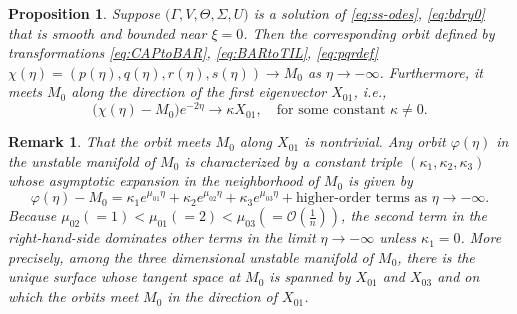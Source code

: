 \documentclass[a4paper,11pt]{article}
\def\BO{{\mathcal{O}}}
\newtheorem{proposition}{Proposition}[section]
\newtheorem{remark}{Remark}[section]
\begin{document}
\begin{proposition} \label{prop1}
    Suppose $\big(\Gamma,V,\Theta,\Sigma,U\big)$ is a solution of \eqref{eq:ss-odes}, \eqref{eq:bdry0} that is smooth and bounded near $\xi=0$. Then the corresponding orbit defined by transformations \eqref{eq:CAPtoBAR}, \eqref{eq:BARtoTIL}, \eqref{eq:pqrdef} $\chi(\eta) = (p(\eta), q(\eta), r(\eta),s(\eta)) \rightarrow M_0$ as $\eta \rightarrow -\infty$. Furthermore, it meets $M_0$ along the direction of the first eigenvector $X_{01}$, i.e.,
    \begin{equation} \label{eq:alpha}
     \big(\chi(\eta) - M_0 \big)e^{-2\eta} \rightarrow \kappa X_{01}, \quad \text{for some constant $\kappa\ne0$.}
    \end{equation}
\end{proposition}
\begin{remark} \label{rem:alpha}
  That the orbit meets $M_0$ along $X_{01}$ is nontrivial. Any orbit $\varphi(\eta)$ in the unstable manifold of $M_0$ is characterized by a constant triple $(\kappa_1,\kappa_2,\kappa_3)$ whose asymptotic expansion in the neighborhood of $M_0$ is given by
\begin{equation}\label{eq:alpha-expan}
 \varphi(\eta) - M_0 = \kappa_1 e^{\mu_{01}\eta} + \kappa_2 e^{\mu_{02}\eta} + \kappa_3 e^{\mu_{03}\eta} + \text{higher-order terms as $\eta \rightarrow -\infty$}. 
\end{equation}
  Because $\mu_{02}(=1)<\mu_{01}(=2)<\mu_{03}(=\BO(\frac{1}{n}))$, the second term in the right-hand-side dominates other terms in the limit $\eta \rightarrow -\infty$ unless $\kappa_1=0$. More precisely, among the three dimensional unstable manifold of $M_0$, there is the unique surface whose tangent space at $M_0$ is spanned by $X_{01}$ and $X_{03}$ and on which the orbits meet $M_0$ in the direction of $X_{01}$. 
\end{remark}
\end{document}
